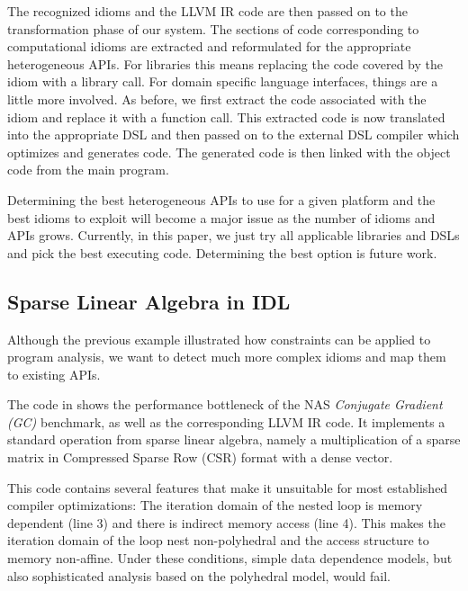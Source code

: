     The recognized idioms and the LLVM IR code are then passed on
    to the transformation phase of our system.
    The sections of code corresponding to computational idioms are extracted
    and reformulated for the appropriate heterogeneous APIs.
    For libraries this means replacing
    the code covered by the idiom with a library call. 
    For domain specific language interfaces,
    things are a little more involved. As before, we first extract the code
    associated with the idiom and replace it with a function call. This
    extracted code is now translated into the appropriate DSL and then
    passed on to the external DSL compiler which optimizes and generates
    code. The generated code is then linked
    with the object code from the main program.

    Determining the best heterogeneous APIs to use for a given platform
    and the best idioms to exploit will become a major issue as the number
    of idioms and APIs grows.  Currently, in this paper, we just try all
    applicable libraries and DSLs and pick the best executing
    code. Determining the best option is future work.

\begin{figure}[p]
    
\end{figure}

\subsection{Sparse Linear Algebra in IDL}

    Although the previous example illustrated how constraints can be applied to 
    program analysis, we want to detect much more complex idioms and 
    map them to existing APIs.

    The code in  shows the performance bottleneck of
    the NAS \emph{Conjugate Gradient (GC)} benchmark, as well as the
    corresponding LLVM IR code.
    It implements a standard operation from sparse linear algebra, namely a
    multiplication of a sparse matrix in Compressed Sparse Row (CSR) format with
    a dense vector.

    This code contains several features that make it unsuitable for most
    established compiler optimizations:
    The iteration domain of the nested loop is memory dependent (line 3) and
    there is indirect memory access (line 4).
    This makes the iteration domain of the loop nest non-polyhedral and the
    access structure to memory non-affine.
    Under these conditions, simple data dependence models, but also
    sophisticated analysis based on the polyhedral model, would fail.

